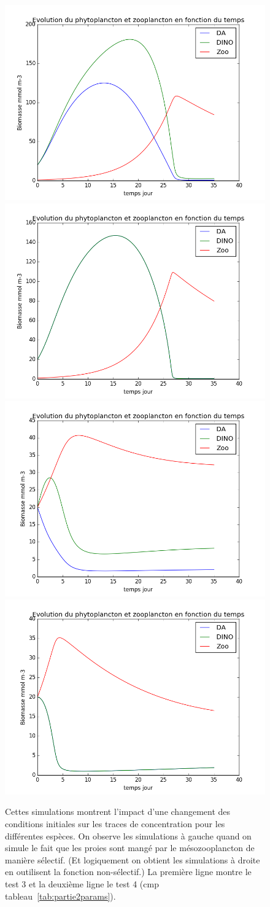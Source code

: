 \begin{figure}
  \includegraphics[width=.5\textwidth]{partie2/test3sel.png}\hfill
  \includegraphics[width=.5\textwidth]{partie2/test3nonsel.png}\\
  \includegraphics[width=.5\textwidth]{partie2/test4sel.png}\hfill
  \includegraphics[width=.5\textwidth]{partie2/test4nonsel.png}
  \caption{Cettes simulations montrent l'impact d'une changement des conditions initiales sur
les traces de concentration pour les différentes espèces. On observe les simulations à gauche
quand on simule le fait que les proies sont mangé par le mésozooplancton de manière sélectif.
(Et logiquement on obtient les simulations à droite en outilisent la fonction non-sélectif.)
La première ligne montre le test 3 et la deuxième ligne le test 4 (cmp
tableau~\ref{tab:partie2params}).}
  \label{fig:partie2Test2}
\end{figure}

